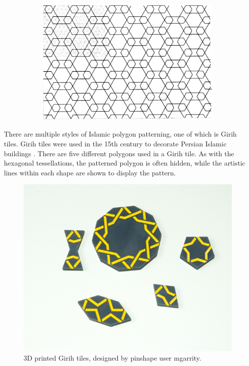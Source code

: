 \documentclass[12pt,letterpaper]{article}
\begin{document}
\begin{figure}[H]
\begin{center}
\begin{subfigure}[b]{.3\linewidth}
        \end{subfigure}
        \begin{subfigure}[b]{.3\linewidth}
            \includegraphics[width=\linewidth]{islam3}
        \end{subfigure}
    \end{center}
\end{figure}

There are multiple styles of Islamic polygon patterning, one of which is Girih tiles. Girih tiles were used in the 15th century to decorate Persian Islamic buildings \citep{girih}. There are five different polygons used in a Girih tile. As with the hexagonal tessellations, the patterned polygon is often hidden, while the artistic lines within each shape are shown to display the pattern.

\begin{figure}[H]
    \begin{center}
        \includegraphics[width=.6\linewidth]{3dgirih}
                \caption{3D printed Girih tiles, designed by pinshape user mgarrity. }
                \label{fig:girih}
    \end{center}
\end{figure}
\end{document}
